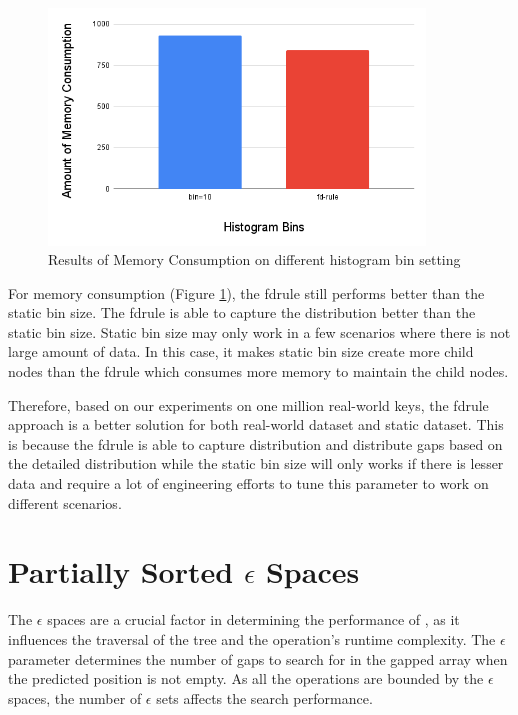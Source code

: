 \begin{figure}[H]
    \centering
    \includegraphics[width=100mm,scale=1]{Figures/MemoryHistBinLogi.png}
    \caption{
     Results of Memory Consumption on different histogram bin setting
    }
    \label{fig:MemoryConsumptionLogi}
\end{figure}

For memory consumption (Figure \ref{fig:MemoryConsumptionLogi}), the \acrshort{fdrule} still performs better than the static bin size. The \acrshort{fdrule} is able to capture the distribution better than the static bin size. Static bin size may only work in a few scenarios where there is not large amount of data. In this case, it makes static bin size create more child nodes than the \acrshort{fdrule} which consumes more memory to maintain the child nodes.

Therefore, based on our experiments on one million real-world keys, the \acrshort{fdrule} approach is a better solution for both real-world dataset and static dataset. This is because the \acrshort{fdrule} is able to capture distribution and distribute gaps based on the detailed distribution while the static bin size will only works if there is lesser data and require a lot of engineering efforts to tune this parameter to work on different scenarios. 



\section{Partially Sorted $\epsilon$ Spaces}
The $\epsilon$ spaces are a crucial factor in determining the performance of \learnindex, as it influences the traversal of the tree and the operation's runtime complexity. The $\epsilon$ parameter determines the number of gaps to search for in the gapped array when the predicted position is not empty. As all the operations are bounded by the $\epsilon$ spaces, the number of $\epsilon$ sets affects the search performance.

